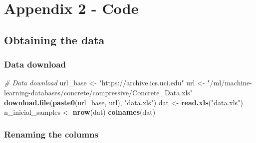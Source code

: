 \documentclass[
]{article}
\newenvironment{Shaded}{\begin{snugshade}}{\end{snugshade}}
\newcommand{\CommentTok}[1]{\textcolor[rgb]{0.56,0.35,0.01}{\textit{#1}}}
\newcommand{\KeywordTok}[1]{\textcolor[rgb]{0.13,0.29,0.53}{\textbf{#1}}}
\newcommand{\NormalTok}[1]{#1}
\newcommand{\OperatorTok}[1]{\textcolor[rgb]{0.81,0.36,0.00}{\textbf{#1}}}
\newcommand{\StringTok}[1]{\textcolor[rgb]{0.31,0.60,0.02}{#1}}
\begin{document}
\hypertarget{appendix2}{%
\section{Appendix 2 - Code}\label{appendix2}}

\hypertarget{obtaining-the-data-1}{%
\subsection{Obtaining the data}\label{obtaining-the-data-1}}

\hypertarget{data-download}{%
\subsubsection{Data download}\label{data-download}}

\label{show-download-data}

\begin{Shaded}
\begin{Highlighting}[]
\CommentTok{# Data download}
\NormalTok{url_base <-}\StringTok{ "https://archive.ics.uci.edu"}
\NormalTok{url <-}\StringTok{  "/ml/machine-learning-databases/concrete/compressive/Concrete_Data.xls"}
\KeywordTok{download.file}\NormalTok{(}\KeywordTok{paste0}\NormalTok{(url_base, url), }\StringTok{"data.xls"}\NormalTok{)}
\NormalTok{dat <-}\StringTok{ }\KeywordTok{read.xls}\NormalTok{(}\StringTok{"data.xls"}\NormalTok{)}
\NormalTok{n_inicial_samples <-}\StringTok{ }\KeywordTok{nrow}\NormalTok{(dat)}
\KeywordTok{colnames}\NormalTok{(dat)}
\end{Highlighting}
\end{Shaded}

\hypertarget{renaming-the-columns}{%
\subsubsection{Renaming the columns}\label{renaming-the-columns}}

\label{show-rename-dat-cols}

\begin{Shaded}
\end{Shaded}
\end{document}
